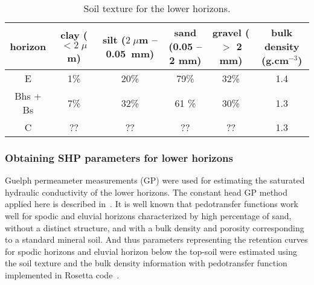 \documentclass[review]{elsarticle}
\begin{document}
%

 \begin{table}[ht]
\begin{center}
\caption{Soil texture for the lower horizons.}
\begin{small}
\doublespacing
\begin{tabular}{c | c  c  c  c  c}
\toprule
horizon & clay ($<2\;\mu$m) & silt ($2\;\mu$m -- 0.05~mm) & sand (0.05 -- 2 mm) & gravel ($>$ 2 mm) & bulk density (g.cm$^{-3}$) \\ \hline
E       & 1\%               & 20\%                        & 79\%                & 32\% & 1.4 \\ 
Bhs + Bs & 7\%              & 32\%                        & 61 \%               & 30\% & 1.3 \\
C        &      ??          & ??                          & ??                  & ?? & 1.3 \\ %
\toprule
\end{tabular}
\end{small}
\label{tab:soiltxt}
\end{center}
\end{table}







\subsubsection{Obtaining SHP parameters for lower horizons}
\label{dolni}

Guelph permeameter measurements (GP) were used for estimating the saturated hydraulic conductivity of the lower horizons.  The constant head GP method applied here is described in~\citep{Jacka1}.
It is well known that pedotransfer functions work well for spodic and eluvial horizons characterized by high percentage of sand, without a distinct structure, and with a bulk density and porosity corresponding to a standard mineral soil. And thus parameters representing the retention curves for spodic horizons and eluvial horizon below the top-soil were estimated using the soil texture and the bulk density information with pedotransfer function implemented in Rosetta code~\citep{Schaap}.
\end{document}
